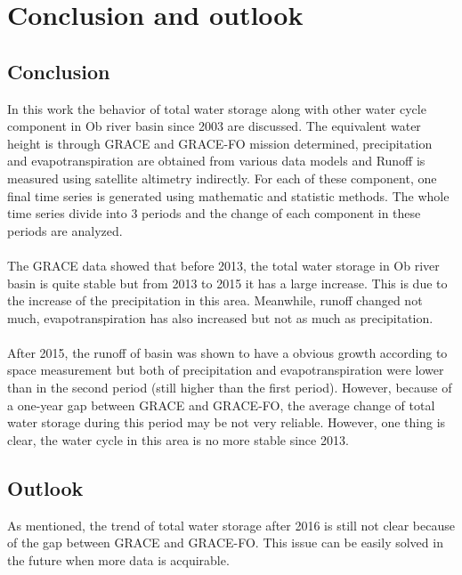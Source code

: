 \chapter{Conclusion and outlook}
\section{Conclusion}
In this work the behavior of total water storage along with other water cycle component in Ob river basin since 2003 are discussed. The equivalent water height is through GRACE and GRACE-FO mission determined, precipitation and evapotranspiration are obtained from various data models and Runoff is measured using satellite altimetry indirectly. For each of these component, one final time series is generated using mathematic and statistic methods. The whole time series divide into 3 periods and the change of each component in these periods are analyzed. \\\\
The GRACE data showed that before 2013, the total water storage in Ob river basin is quite stable but from 2013 to 2015 it has a large increase. This is due to the increase of the precipitation in this area. Meanwhile, runoff changed not much, evapotranspiration has also increased but not as much as precipitation.\\\\
After 2015, the runoff of basin was shown to have a obvious growth according to space measurement but both of precipitation and evapotranspiration were lower than in the second period (still higher than the first period). However, because of a one-year gap between GRACE and GRACE-FO, the average change of total water storage during this period may be not very reliable. However, one thing is clear, the water cycle in this area is no more stable since 2013.
\section{Outlook}
As mentioned, the trend of total water storage after 2016 is still not clear because of the gap between GRACE and GRACE-FO. This issue can be easily solved in the future when more data is acquirable. 